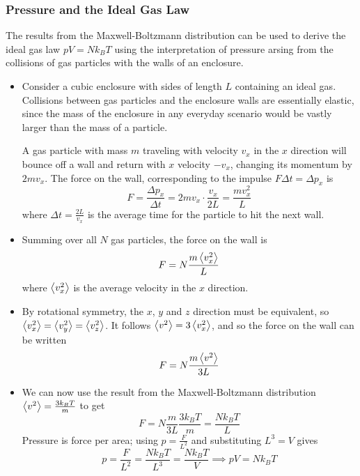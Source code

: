 \documentclass[11pt, a4paper]{article}
\begin{document}
\subsubsection{Pressure and the Ideal Gas Law}
The results from the Maxwell-Boltzmann distribution can be used to derive the ideal gas law $ pV = Nk_{B}T $ using the interpretation of pressure arsing from the collisions of gas particles with the walls of an enclosure.
\begin{itemize}
	\item Consider a cubic enclosure with sides of length $ L $ containing an ideal gas. Collisions between gas particles and the enclosure walls are essentially elastic, since the mass of the enclosure in any everyday scenario would be vastly larger than the mass of a particle.
	
	A gas particle with mass $ m $ traveling with velocity $ v_{x} $ in the $ x $ direction will bounce off a wall and return with $ x $ velocity $ - v_{x} $, changing its momentum by $ 2 m v_{x}$. The force on the wall, corresponding to the impulse $ F \Delta t = \Delta p_{x}  $ is
	\begin{equation*}
		F = \frac{\Delta p_{x}}{\Delta t} = 2mv_{x}\cdot \frac{v_{x}}{2L}= \frac{mv_{x}^{2}}{L}
	\end{equation*}
	where $ \Delta t = \frac{2L}{v_{x}} $ is the average time for the particle to hit the next wall. 
	
	\item Summing over all $ N $ gas particles, the force on the wall is
	\begin{equation*}
		F = N \frac{m \expval{v_{x}^{2}}}{L}
	\end{equation*}
	where $ \expval{v_{x}^{2}} $ is the average velocity in the $ x $ direction. 
	
	\item By rotational symmetry, the $ x $, $ y $ and $ z $ direction must be equivalent, so $ \expval{v_{x}^{2}} = \expval{v_{y}^{2}} = \expval{v_{z}^{2}} $. It follows  $ \expval{v^{2}} = 3 \expval{v_{x}^{2}} $, and so the force on the wall can be written
	\begin{equation*}
		F = N \frac{m \expval{v^{2}}}{3L}
	\end{equation*}
	
	\item We can now use the result from the Maxwell-Boltzmann distribution $ \expval{v^{2}} = \frac{3k_{B}T}{m}$ to get
	\begin{equation*}
		F = N \frac{m}{3L} \frac{3k_{B}T}{m} = \frac{Nk_{B}T}{L}
	\end{equation*}
	Pressure is force per area; using $ p = \frac{F}{L^{2}} $ and substituting $ L^{3} = V $ gives
	\begin{equation*}
		p = \frac{F}{L^{2}} = \frac{Nk_{B}T}{L^{3}} = \frac{Nk_{B}T}{V} \implies pV = Nk_{B}T
	\end{equation*}
\end{itemize}
\end{document}
